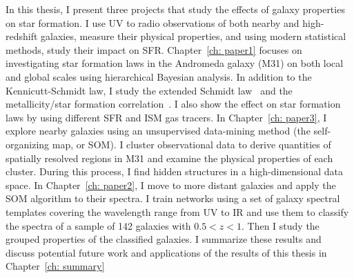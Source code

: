 In this thesis, I present three projects that study the effects of galaxy properties on star formation.
I use UV to radio observations of both nearby and high-redshift galaxies, measure their physical properties, and using modern statistical methods, study their impact on SFR.
Chapter~\ref{ch: paper1} focuses on investigating star formation laws in the Andromeda galaxy (M31) on both local and global scales using hierarchical Bayesian analysis.
In addition to the Kennicutt-Schmidt law, I study the extended Schmidt law~\citep{Shi11} and the metallicity/star formation correlation~\citep{Krumholz09}.
I also show the effect on star formation laws by using different SFR and ISM gas tracers.
In Chapter~\ref{ch: paper3}, I explore nearby galaxies using an unsupervised data-mining method (the self-organizing map, or SOM).
I cluster observational data to derive quantities of spatially resolved regions in M31 and examine the physical properties of each cluster.
During this process, I find hidden structures in a high-dimensional data space.
In Chapter~\ref{ch: paper2}, I move to more distant galaxies and apply the SOM algorithm to their spectra.
I train networks using a set of galaxy spectral templates covering the wavelength range from UV to IR and use them to classify the spectra of a sample of 142 galaxies with $0.5 < z < 1$. 
Then I study the grouped properties of the classified galaxies.
I summarize these results and discuss potential future work and applications of the results of this thesis in Chapter~\ref{ch: summary}

 
